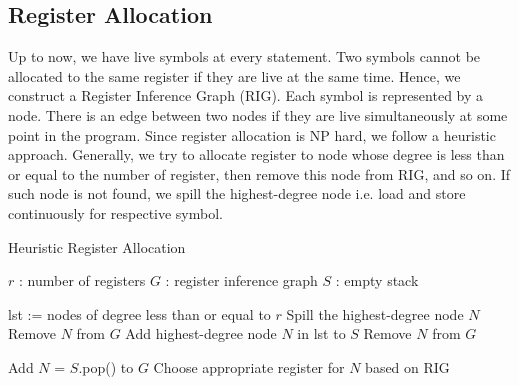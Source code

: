 \subsection{Register Allocation}
Up to now, we have live symbols at every statement. Two symbols cannot be allocated to the same register if they are live at the same time. Hence, we construct a Register Inference Graph (RIG). Each symbol is represented by a node. There is an edge between two nodes if they are live simultaneously at some point in the program. Since register allocation is NP hard, we follow a heuristic approach. Generally, we try to allocate register to node whose degree is less than or equal to the number of register, then remove this node from RIG, and so on. If such node is not found, we spill the highest-degree node i.e. load and store continuously for respective symbol.

\begin{algorithm}
  \caption{Heuristic Register Allocation}
  \begin{algorithmic}
    \STATE $r$ : number of registers
    \STATE $G$ : register inference graph
    \STATE $S$ : empty stack

    \STATE lst := nodes of degree less than or equal to $r$
    \STATE Spill the highest-degree node $N$
    \STATE Remove $N$ from $G$
    \ELSE
    \STATE Add highest-degree node $N$ in lst to $S$
    \STATE Remove $N$ from $G$
    \ENDIF
    \ENDWHILE

    \STATE Add $N$ = $S$.pop() to $G$
    \STATE Choose appropriate register for $N$ based on RIG
    \ENDWHILE
  \end{algorithmic}
\end{algorithm}